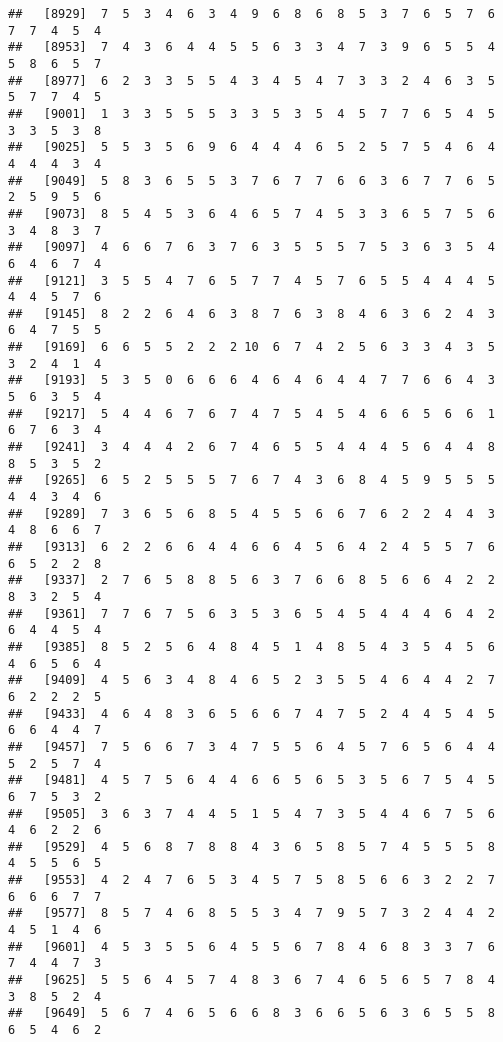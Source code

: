 \documentclass[
]{book}
\begin{document}
\begin{verbatim}
##   [8929]  7  5  3  4  6  3  4  9  6  8  6  8  5  3  7  6  5  7  6  7  7  4  5  4
##   [8953]  7  4  3  6  4  4  5  5  6  3  3  4  7  3  9  6  5  5  4  5  8  6  5  7
##   [8977]  6  2  3  3  5  5  4  3  4  5  4  7  3  3  2  4  6  3  5  5  7  7  4  5
##   [9001]  1  3  3  5  5  5  3  3  5  3  5  4  5  7  7  6  5  4  5  3  3  5  3  8
##   [9025]  5  5  3  5  6  9  6  4  4  4  6  5  2  5  7  5  4  6  4  4  4  4  3  4
##   [9049]  5  8  3  6  5  5  3  7  6  7  7  6  6  3  6  7  7  6  5  2  5  9  5  6
##   [9073]  8  5  4  5  3  6  4  6  5  7  4  5  3  3  6  5  7  5  6  3  4  8  3  7
##   [9097]  4  6  6  7  6  3  7  6  3  5  5  5  7  5  3  6  3  5  4  6  4  6  7  4
##   [9121]  3  5  5  4  7  6  5  7  7  4  5  7  6  5  5  4  4  4  5  4  4  5  7  6
##   [9145]  8  2  2  6  4  6  3  8  7  6  3  8  4  6  3  6  2  4  3  6  4  7  5  5
##   [9169]  6  6  5  5  2  2  2 10  6  7  4  2  5  6  3  3  4  3  5  3  2  4  1  4
##   [9193]  5  3  5  0  6  6  6  4  6  4  6  4  4  7  7  6  6  4  3  5  6  3  5  4
##   [9217]  5  4  4  6  7  6  7  4  7  5  4  5  4  6  6  5  6  6  1  6  7  6  3  4
##   [9241]  3  4  4  4  2  6  7  4  6  5  5  4  4  4  5  6  4  4  8  8  5  3  5  2
##   [9265]  6  5  2  5  5  5  7  6  7  4  3  6  8  4  5  9  5  5  5  4  4  3  4  6
##   [9289]  7  3  6  5  6  8  5  4  5  5  6  6  7  6  2  2  4  4  3  4  8  6  6  7
##   [9313]  6  2  2  6  6  4  4  6  6  4  5  6  4  2  4  5  5  7  6  6  5  2  2  8
##   [9337]  2  7  6  5  8  8  5  6  3  7  6  6  8  5  6  6  4  2  2  8  3  2  5  4
##   [9361]  7  7  6  7  5  6  3  5  3  6  5  4  5  4  4  4  6  4  2  6  4  4  5  4
##   [9385]  8  5  2  5  6  4  8  4  5  1  4  8  5  4  3  5  4  5  6  4  6  5  6  4
##   [9409]  4  5  6  3  4  8  4  6  5  2  3  5  5  4  6  4  4  2  7  6  2  2  2  5
##   [9433]  4  6  4  8  3  6  5  6  6  7  4  7  5  2  4  4  5  4  5  6  6  4  4  7
##   [9457]  7  5  6  6  7  3  4  7  5  5  6  4  5  7  6  5  6  4  4  5  2  5  7  4
##   [9481]  4  5  7  5  6  4  4  6  6  5  6  5  3  5  6  7  5  4  5  6  7  5  3  2
##   [9505]  3  6  3  7  4  4  5  1  5  4  7  3  5  4  4  6  7  5  6  4  6  2  2  6
##   [9529]  4  5  6  8  7  8  8  4  3  6  5  8  5  7  4  5  5  5  8  4  5  5  6  5
##   [9553]  4  2  4  7  6  5  3  4  5  7  5  8  5  6  6  3  2  2  7  6  6  6  7  7
##   [9577]  8  5  7  4  6  8  5  5  3  4  7  9  5  7  3  2  4  4  2  4  5  1  4  6
##   [9601]  4  5  3  5  5  6  4  5  5  6  7  8  4  6  8  3  3  7  6  7  4  4  7  3
##   [9625]  5  5  6  4  5  7  4  8  3  6  7  4  6  5  6  5  7  8  4  3  8  5  2  4
##   [9649]  5  6  7  4  6  5  6  6  8  3  6  6  5  6  3  6  5  5  8  6  5  4  6  2

\end{verbatim}
\end{document}
